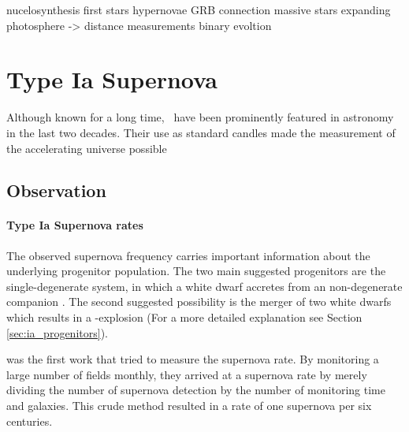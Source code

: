 \vspace{3cm}
nucelosynthesis
first stars
hypernovae
GRB connection
massive stars
expanding photosphere -> distance measurements
binary evoltion




\section{Type Ia Supernova}
Although known for a long time, \sneia\ have been prominently featured in astronomy in the last two decades. Their use as standard candles made the measurement of the accelerating universe possible \citep{1998AJ....116.1009R, 1999ApJ...517..565P}

\subsection{Observation}

\paragraph{Type Ia Supernova rates} 
The observed supernova frequency carries important information about the underlying progenitor population. The two main suggested progenitors are the single-degenerate system, in which a white dwarf accretes from an non-degenerate companion . The second suggested possibility is the merger of two white dwarfs which results in a \snia-explosion (For a more detailed explanation see Section \ref{sec:ia_progenitors}). 

\citet{1938ApJ....88..529Z} was the first work that tried to measure the supernova rate. By monitoring a large number of fields monthly, they arrived at a supernova rate by merely dividing the number of supernova detection by the number of monitoring time and galaxies. This crude method resulted in a rate of one supernova per six centuries. 

